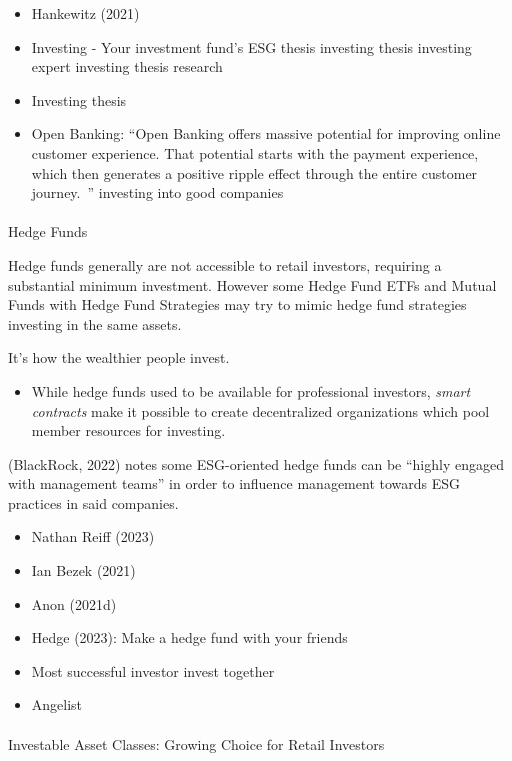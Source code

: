 \documentclass[
  letterpaper,
  DIV=11,
  numbers=noendperiod]{scrartcl}
\makeatletter
\let\oldparagraph\paragraph
\renewcommand{\paragraph}{
    \@ifstar
      \xxxParagraphStar
      \xxxParagraphNoStar
  }
\newcommand{\xxxParagraphStar}[1]{\oldparagraph*{#1}\mbox{}}
\newcommand{\xxxParagraphNoStar}[1]{\oldparagraph{#1}\mbox{}}
\providecommand{\tightlist}{%
  \setlength{\itemsep}{0pt}\setlength{\parskip}{0pt}}\usepackage{longtable,booktabs,array}
\makeatother
\begin{document}
\begin{itemize}
\item
  Hankewitz (2021)
\item
  Investing - Your investment fund's ESG thesis investing thesis
  investing expert investing thesis research
\item
  Investing thesis
\item
  Open Banking: ``Open Banking offers massive potential for improving
  online customer experience. That potential starts with the payment
  experience, which then generates a positive ripple effect through the
  entire customer journey.~'' investing into good companies
\end{itemize}

\paragraph{Hedge Funds}\label{hedge-funds}

Hedge funds generally are not accessible to retail investors, requiring
a substantial minimum investment. However some Hedge Fund ETFs and
Mutual Funds with Hedge Fund Strategies may try to mimic hedge fund
strategies investing in the same assets.

It's how the wealthier people invest.

\begin{itemize}
\tightlist
\item
  While hedge funds used to be available for professional investors,
  \emph{smart contracts} make it possible to create decentralized
  organizations which pool member resources for investing.
\end{itemize}

(BlackRock, 2022) notes some ESG-oriented hedge funds can be ``highly
engaged with management teams'' in order to influence management towards
ESG practices in said companies.

\begin{itemize}
\item
  Nathan Reiff (2023)
\item
  Ian Bezek (2021)
\item
  Anon (2021d)
\item
  Hedge (2023): Make a hedge fund with your friends
\item
  Most successful investor invest together
\item
  Angelist
\end{itemize}

\paragraph{Investable Asset Classes: Growing Choice for Retail
Investors}\label{investable-asset-classes-growing-choice-for-retail-investors}
\end{document}
